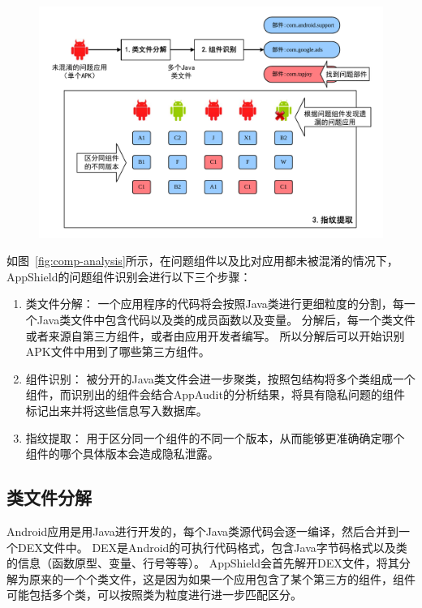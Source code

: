 \begin{figure}
	\centering
	\includegraphics[width=1\textwidth]{figure/comp-analysis.pdf}
\end{figure}


如图~\ref{fig:comp-analysis}所示，在问题组件以及比对应用都未被混淆的情况下，AppShield的问题组件识别会进行以下三个步骤：

\begin{enumerate}
	\item 类文件分解：
		一个应用程序的代码将会按照Java类进行更细粒度的分割，每一个Java类文件中包含代码以及类的成员函数以及变量。
		分解后，每一个类文件或者来源自第三方组件，或者由应用开发者编写。
		所以分解后可以开始识别APK文件中用到了哪些第三方组件。
	\item 组件识别：
		被分开的Java类文件会进一步聚类，按照包结构将多个类组成一个组件，而识别出的组件会结合AppAudit的分析结果，将具有隐私问题的组件标记出来并将这些信息写入数据库。
	\item 指纹提取：
		用于区分同一个组件的不同一个版本，从而能够更准确确定哪个组件的哪个具体版本会造成隐私泄露。
\end{enumerate}

\subsection{类文件分解}
Android应用是用Java进行开发的，每个Java类源代码会逐一编译，然后合并到一个DEX文件中。
DEX是Android的可执行代码格式，包含Java字节码格式以及类的信息（函数原型、变量、行号等等）。
AppShield会首先解开DEX文件，将其分解为原来的一个个类文件，这是因为如果一个应用包含了某个第三方的组件，组件可能包括多个类，可以按照类为粒度进行进一步匹配区分。

